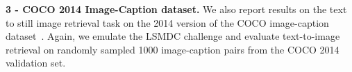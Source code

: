 \documentclass[runningheads]{llncs}
\begin{document}
{\noindent \bf{3 - COCO 2014 Image-Caption dataset.}} We also report results on the text to still image retrieval task on the 2014 version of the COCO image-caption dataset~\cite{lin14coco}. Again, we emulate the LSMDC challenge and evaluate text-to-image retrieval on randomly sampled 1000 image-caption pairs from the COCO 2014 validation set.
\begin{table}[t]
  \setlength{\tabcolsep}{3pt}
      \caption{\small Ablation study on the MPII movie dataset. R@k denotes recall@k (higher is better), MR denotes mean rank (lower is better). Multiple choice is measured in accuracy (higher is better).
      }
    \centering
      \label{table:mpii-ablation}
\end{table}
\end{document}
